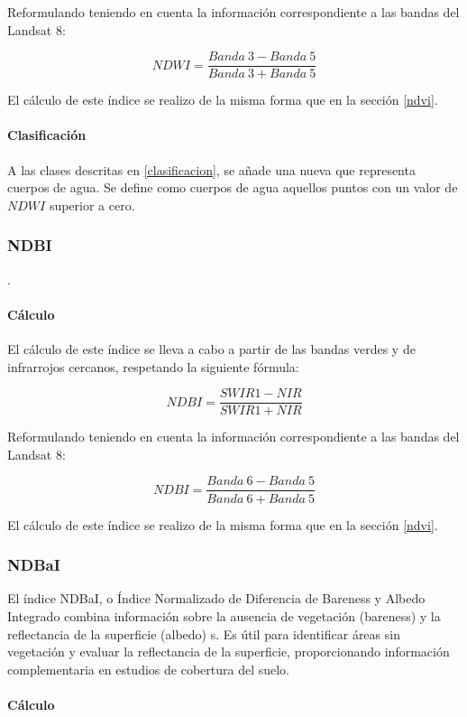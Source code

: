 Reformulando teniendo en cuenta la información correspondiente a las bandas del Landsat 8:

$$NDWI = \frac{Banda~3-Banda~5}{Banda~3+Banda~5}$$

El cálculo de este índice se realizo de la misma forma que en la sección \ref{ndvi}.


\paragraph{Clasificación} 

A las clases descritas en \ref{clasificacion}, se añade una nueva que representa cuerpos de agua. Se define como cuerpos de agua aquellos puntos con un valor de $NDWI$ superior a cero.

\subsubsection{NDBI}

\parencite{zha_use_2003}.

\paragraph{Cálculo}

El cálculo de este índice se lleva a cabo a partir de las bandas verdes y de infrarrojos cercanos, respetando la siguiente fórmula:

$$NDBI = \frac{SWIR1 - NIR}{SWIR1 + NIR}$$

Reformulando teniendo en cuenta la información correspondiente a las bandas del Landsat 8:

$$NDBI = \frac{Banda~6-Banda~5}{Banda~6+Banda~5}$$

El cálculo de este índice se realizo de la misma forma que en la sección \ref{ndvi}.

\subsubsection{NDBaI}

El índice NDBaI, o Índice Normalizado de Diferencia de Bareness y Albedo Integrado combina información sobre la ausencia de vegetación (bareness) y la reflectancia de la superficie (albedo) \parencite{hongmei_zhao_use_2005}s. Es útil para identificar áreas sin vegetación y evaluar la reflectancia de la superficie, proporcionando información complementaria en estudios de cobertura del suelo.

\paragraph{Cálculo}

